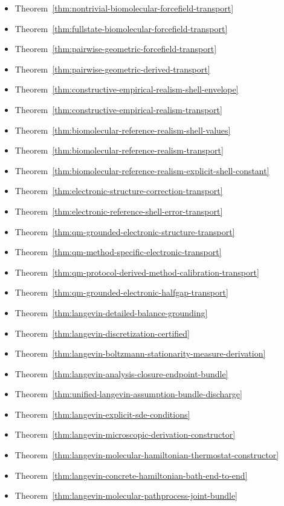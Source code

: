 \begin{itemize}
\item Theorem~\ref{thm:nontrivial-biomolecular-forcefield-transport}
\item Theorem~\ref{thm:fullstate-biomolecular-forcefield-transport}
\item Theorem~\ref{thm:pairwise-geometric-forcefield-transport}
\item Theorem~\ref{thm:pairwise-geometric-derived-transport}
\item Theorem~\ref{thm:constructive-empirical-realism-shell-envelope}
\item Theorem~\ref{thm:constructive-empirical-realism-transport}
\item Theorem~\ref{thm:biomolecular-reference-realism-shell-values}
\item Theorem~\ref{thm:biomolecular-reference-realism-transport}
\item Theorem~\ref{thm:biomolecular-reference-realism-explicit-shell-constant}
\item Theorem~\ref{thm:electronic-structure-correction-transport}
\item Theorem~\ref{thm:electronic-reference-shell-error-transport}
\item Theorem~\ref{thm:qm-grounded-electronic-structure-transport}
\item Theorem~\ref{thm:qm-method-specific-electronic-transport}
\item Theorem~\ref{thm:qm-protocol-derived-method-calibration-transport}
\item Theorem~\ref{thm:qm-grounded-electronic-halfgap-transport}
\item Theorem~\ref{thm:langevin-detailed-balance-grounding}
\item Theorem~\ref{thm:langevin-discretization-certified}
\item Theorem~\ref{thm:langevin-boltzmann-stationarity-measure-derivation}
\item Theorem~\ref{thm:langevin-analysis-closure-endpoint-bundle}
\item Theorem~\ref{thm:unified-langevin-assumption-bundle-discharge}
\item Theorem~\ref{thm:langevin-explicit-sde-conditions}
\item Theorem~\ref{thm:langevin-microscopic-derivation-constructor}
\item Theorem~\ref{thm:langevin-molecular-hamiltonian-thermostat-constructor}
\item Theorem~\ref{thm:langevin-concrete-hamiltonian-bath-end-to-end}
\item Theorem~\ref{thm:langevin-molecular-pathprocess-joint-bundle}

\end{itemize}
